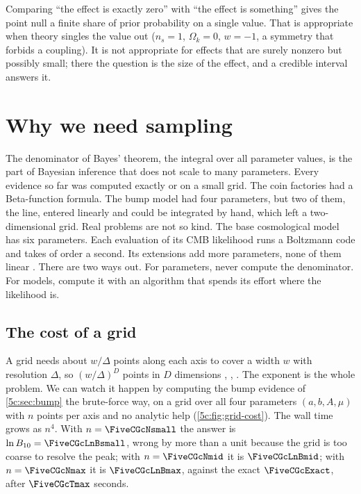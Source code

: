 \begin{pitfall}
Comparing ``the effect is exactly zero'' with ``the effect is something'' gives the point
null a finite share of prior probability on a single value. That is appropriate when
theory singles the value out ($n_s=1$, $\Omega_k=0$, $w=-1$, a symmetry that forbids a
coupling). It is not appropriate for effects that are surely nonzero but possibly small;
there the question is the size of the effect, and a credible interval answers it.
\end{pitfall}
\section{Why we need sampling}
\label{5c:sec:sampling}

The denominator of Bayes' theorem, the integral over all parameter values, is the part
of Bayesian inference that does not scale to many parameters. Every evidence so far
was computed exactly or on a small grid. The coin factories had a Beta-function
formula. The bump model had four parameters, but two of them, the line, entered
linearly and could be integrated by hand, which left a two-dimensional grid. Real
problems are not so kind. The base cosmological model has six parameters. Each
evaluation of its CMB likelihood runs a Boltzmann code and takes of order a second.
Its extensions add more parameters, none of them linear .
There are two ways out. For parameters, never compute the denominator. For models,
compute it with an algorithm that spends its effort where the likelihood is.

\subsection{The cost of a grid}
\label{5c:sec:grid-cost}

A grid needs about $w/\Delta$ points along each axis to cover a width $w$ with
resolution $\Delta$, so $(w/\Delta)^D$ points in $D$ dimensions
, , . The exponent
is the whole problem. We can watch it happen by computing the bump evidence of
\cref{5c:sec:bump} the brute-force way, on a grid over all four parameters $(a,b,A,\mu)$
with $n$ points per axis and no analytic help (\cref{5c:fig:grid-cost}). The wall time
grows as $n^4$. With $n=\FiveCGcNsmall$ the answer is $\ln B_{10}=\FiveCGcLnBsmall$,
wrong by more than a unit because the grid is too coarse to resolve the peak; with
$n=\FiveCGcNmid$ it is $\FiveCGcLnBmid$; with $n=\FiveCGcNmax$ it is $\FiveCGcLnBmax$,
against the exact $\FiveCGcExact$, after $\FiveCGcTmax$ seconds.

